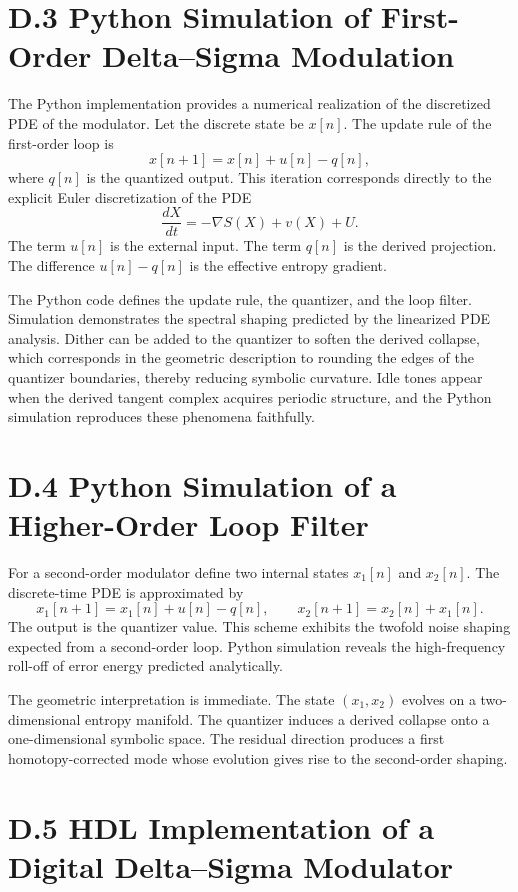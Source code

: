 \section{D.3 Python Simulation of First-Order Delta–Sigma Modulation}

The Python implementation provides a numerical realization of the discretized PDE of the modulator. Let the discrete state be \(x[n]\). The update rule of the first-order loop is
\[
x[n+1] = x[n] + u[n] - q[n],
\]
where \(q[n]\) is the quantized output. This iteration corresponds directly to the explicit Euler discretization of the PDE
\[
\frac{dX}{dt} = -\nabla S(X) + v(X) + U.
\]
The term \(u[n]\) is the external input. The term \(q[n]\) is the derived projection. The difference \(u[n] - q[n]\) is the effective entropy gradient.

The Python code defines the update rule, the quantizer, and the loop filter. Simulation demonstrates the spectral shaping predicted by the linearized PDE analysis. Dither can be added to the quantizer to soften the derived collapse, which corresponds in the geometric description to rounding the edges of the quantizer boundaries, thereby reducing symbolic curvature. Idle tones appear when the derived tangent complex acquires periodic structure, and the Python simulation reproduces these phenomena faithfully.

\section{D.4 Python Simulation of a Higher-Order Loop Filter}

For a second-order modulator define two internal states \(x_{1}[n]\) and \(x_{2}[n]\). The discrete-time PDE is approximated by
\[
x_{1}[n+1] = x_{1}[n] + u[n] - q[n],
\qquad
x_{2}[n+1] = x_{2}[n] + x_{1}[n].
\]
The output is the quantizer value. This scheme exhibits the twofold noise shaping expected from a second-order loop. Python simulation reveals the high-frequency roll-off of error energy predicted analytically.

The geometric interpretation is immediate. The state \((x_{1},x_{2})\) evolves on a two-dimensional entropy manifold. The quantizer induces a derived collapse onto a one-dimensional symbolic space. The residual direction produces a first homotopy-corrected mode whose evolution gives rise to the second-order shaping.

\section{D.5 HDL Implementation of a Digital Delta–Sigma Modulator}

